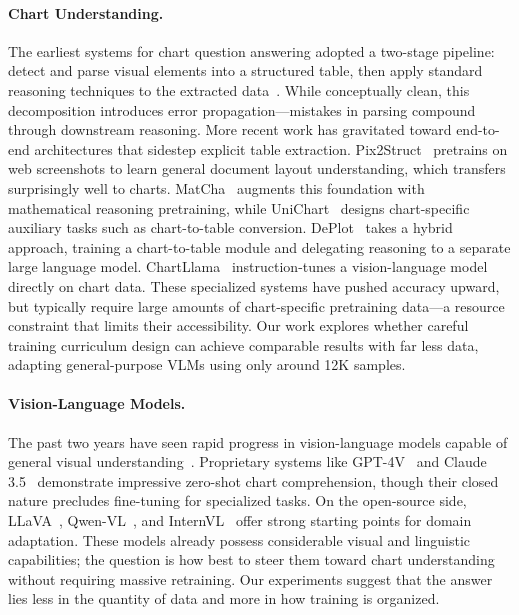\documentclass[journal]{IEEEtran}
\begin{document}
\paragraph{Chart Understanding.}
The earliest systems for chart question answering adopted a two-stage pipeline: detect and parse visual elements into a structured table, then apply standard reasoning techniques to the extracted data~\cite{kafle2018dvqa,kahou2017figureqa}. While conceptually clean, this decomposition introduces error propagation---mistakes in parsing compound through downstream reasoning. More recent work has gravitated toward end-to-end architectures that sidestep explicit table extraction. Pix2Struct~\cite{lee2023pix2struct} pretrains on web screenshots to learn general document layout understanding, which transfers surprisingly well to charts. MatCha~\cite{liu2023matcha} augments this foundation with mathematical reasoning pretraining, while UniChart~\cite{masry2023unichart} designs chart-specific auxiliary tasks such as chart-to-table conversion. DePlot~\cite{liu2023deplot} takes a hybrid approach, training a chart-to-table module and delegating reasoning to a separate large language model. ChartLlama~\cite{han2023chartllama} instruction-tunes a vision-language model directly on chart data. These specialized systems have pushed accuracy upward, but typically require large amounts of chart-specific pretraining data---a resource constraint that limits their accessibility. Our work explores whether careful training curriculum design can achieve comparable results with far less data, adapting general-purpose VLMs using only around 12K samples.

\paragraph{Vision-Language Models.}
The past two years have seen rapid progress in vision-language models capable of general visual understanding~\cite{liu2024visual,chen2024internvl,bai2023qwen}. Proprietary systems like GPT-4V~\cite{openai2023gpt4v} and Claude 3.5~\cite{anthropic2024claude} demonstrate impressive zero-shot chart comprehension, though their closed nature precludes fine-tuning for specialized tasks. On the open-source side, LLaVA~\cite{liu2024visual}, Qwen-VL~\cite{bai2023qwen}, and InternVL~\cite{chen2024internvl} offer strong starting points for domain adaptation. These models already possess considerable visual and linguistic capabilities; the question is how best to steer them toward chart understanding without requiring massive retraining. Our experiments suggest that the answer lies less in the quantity of data and more in how training is organized.
\end{document}
